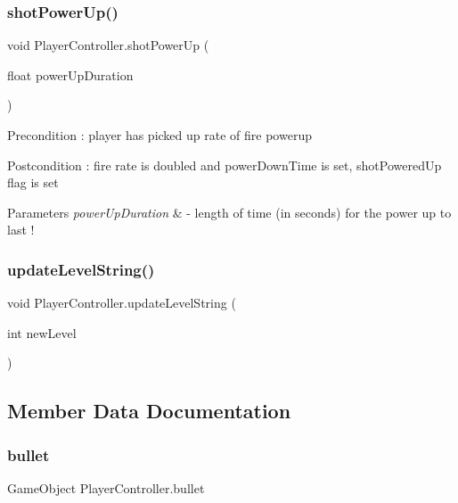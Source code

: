 \subsubsection{\texorpdfstring{shotPowerUp()}{shotPowerUp()}}
{\footnotesize\ttfamily void Player\+Controller.\+shot\+Power\+Up (\begin{DoxyParamCaption}\item[{float}]{power\+Up\+Duration }\end{DoxyParamCaption})}

\begin{DoxyPrecond}{Precondition}
\+: player has picked up rate of fire powerup 
\end{DoxyPrecond}
\begin{DoxyPostcond}{Postcondition}
\+: fire rate is doubled and power\+Down\+Time is set, shot\+Powered\+Up flag is set 
\end{DoxyPostcond}

\begin{DoxyParams}{Parameters}
{\em power\+Up\+Duration} & -\/ length of time (in seconds) for the power up to last ! \\
\hline
\end{DoxyParams}
\mbox{\label{class_player_controller_a201205acdeda463736f868b6f20f05a3}} 
\subsubsection{\texorpdfstring{updateLevelString()}{updateLevelString()}}
{\footnotesize\ttfamily void Player\+Controller.\+update\+Level\+String (\begin{DoxyParamCaption}\item[{int}]{new\+Level }\end{DoxyParamCaption})}



\subsection{Member Data Documentation}
\mbox{\label{class_player_controller_a47d9b8f67993f190c8f170bc3f134ee6}} 
\subsubsection{\texorpdfstring{bullet}{bullet}}
{\footnotesize\ttfamily Game\+Object Player\+Controller.\+bullet}



